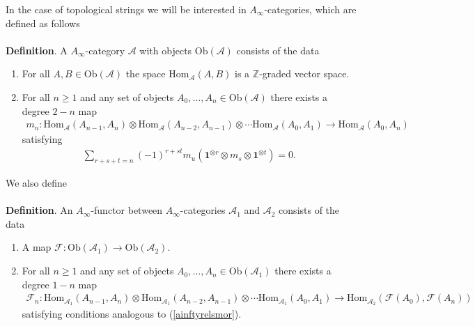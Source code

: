 \documentclass[a4paper,11pt]{article}
\numberwithin{equation}{section}
\begin{document}
In the case of topological strings we will be interested in 
$A_{\infty}$-categories, which are defined as follows
\\\\
\textbf{Definition}. A $A_{\infty}$-category $\mathcal{A}$ with objects 
$\mathrm{Ob}(\mathcal{A})$ consists of the data
\begin{enumerate}
 \item For all $A,B\in\mathrm{Ob}(\mathcal{A})$ the space 
$\mathrm{Hom}_{\mathcal{A}}(A,B)$ is a $\mathbb{Z}$-graded vector space.
\item For all $n\geq 1$ and any set of objects $A_{0},\ldots, 
A_{n}\in\mathrm{Ob}(\mathcal{A})$ there exists a degree $2-n$ map
\begin{eqnarray}\label{mnAcat}
m_{n}:\mathrm{Hom}_{\mathcal{A}}(A_{n-1},A_{n})\otimes 
\mathrm{Hom}_{\mathcal{A}}(A_{n-2},A_{n-1})\otimes\cdots 
\mathrm{Hom}_{\mathcal{A}}(A_{0},A_{1})\rightarrow\mathrm{Hom}_{\mathcal{A}}(A_{
0},A_{n})\nonumber
\end{eqnarray}
satisfying
\begin{eqnarray}
\sum_{r+s+t=n}(-1)^{r+st}m_{u}(\mathbf{1}^{\otimes r}\otimes m_{s}\otimes 
\mathbf{1}^{\otimes 
t})=0.
\end{eqnarray}
\end{enumerate}

We also define\\\\
\textbf{Definition}. An $A_{\infty}$-functor between $A_{\infty}$-categories 
$\mathcal{A}_{1}$ and $\mathcal{A}_{2}$ consists of the data
\begin{enumerate}
 \item A map $\mathcal{F}:\mathrm{Ob}(\mathcal{A}_{1})\rightarrow 
\mathrm{Ob}(\mathcal{A}_{2})$.
\item For all $n\geq 1$ and any set of objects $A_{0},\ldots, 
A_{n}\in\mathrm{Ob}(\mathcal{A}_{1})$ there exists a degree $1-n$ map
\begin{eqnarray}
\mathcal{F}_{n}:\mathrm{Hom}_{\mathcal{A}_{1}}(A_{n-1},A_{n})\otimes 
\mathrm{Hom}_{\mathcal{A}_{1}}(A_{n-2},A_{n-1})\otimes\cdots 
\mathrm{Hom}_{\mathcal{A}_{1}}(A_{0},A_{1})\rightarrow\mathrm{Hom}_{\mathcal{A}_
{2}} (\mathcal{F}(A_ {
0}),\mathcal{F}(A_{n}))\nonumber
\end{eqnarray}
satisfying conditions analogous to (\ref{ainftyrelsmor}).
\end{enumerate}
\end{document}
